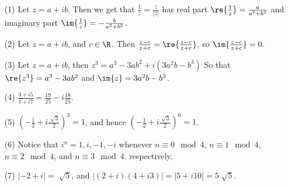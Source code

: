 \begin{example}\label{example_1.1}
    \begin{enumerate}
        \item[(1)] Let $z=a+ib$. Then we get that
            $\frac{1}{z}=\frac{\bar{z}}{|z|}$ has real part
            $\re{\frac{1}{z}}=\frac{a}{a^2+b^2}$ and imaginary part
            $\im{\frac{1}{z}}=-\frac{b}{a^2+b^2}$.

        \item[(2)] Let $z=a+ib$, and  $c \in \R$. Then
            $\frac{z-c}{z+c}=\re{\frac{z-c}{z+c}}$, so $\im{\frac{z-c}{z+c}}=0$.

        \item[(3)] Let $z=a+ib$, then $z^3=a^3-3ab^2+i(3a^2b-b^3)$ So that
            $\re{z^3}=a^3-3ab^2$ and $\im{z}=3a^2b-b^3$.

        \item[(4)] $\frac{3+i5}{1+i7}=\frac{19}{25}-i\frac{18}{25}$.

        \item[(5)] $(-\frac{1}{2}+i\frac{\sqrt[]{3}}{2})^3=1$, and hence
            $(-\frac{1}{2}+i\frac{\sqrt[]{3}}{2})^6=1$.

        \item[(6)] Notice that $i^n=1,i,-1,-i$ whenever  $n \equiv 0 \mod{4}$,
            $n \equiv 1 \mod{4}$, $n \equiv 2 \mod{4}$, and $n \equiv 3
            \mod{4}$.
            respectively.

        \item[(7)] $|-2+i|=\sqrt[]{5}$, and
            $|(2+i)(4+i3)|=|5+i10|=5\sqrt[]{5}$.
    \end{enumerate}
\end{example}

